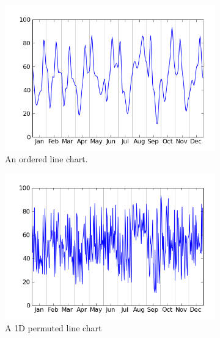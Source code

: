\documentclass{article} %
\begin{document}
\begin{figure}
        \centering
        \begin{subfigure}[b]{0.45\textwidth}
                \includegraphics[width=\textwidth]{figures/conditions-a.png}
                \caption{An ordered line chart.}
                \label{fig:avg_line}
        \end{subfigure}
        \begin{subfigure}[b]{0.45\textwidth}
                \includegraphics[width=\textwidth]{figures/conditions-b.png}
                \caption{A 1D permuted line chart}
                \label{fig:avg_line_p}
        \end{subfigure}
        \\
        \begin{subfigure}[b]{0.45\textwidth}

\end{subfigure}
\end{figure}
\end{document}
